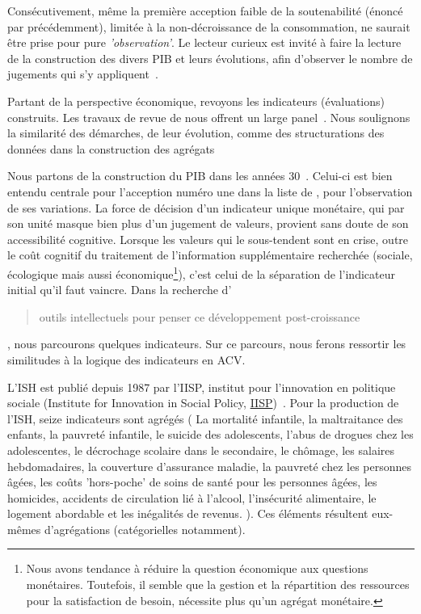 Consécutivement, même la première acception faible de la soutenabilité (énoncé par \citeauthor{perman_natural_2009} précédemment), limitée à la non-décroissance de la consommation, ne saurait être prise pour pure \emph{'observation'}.
Le lecteur curieux est invité à faire la lecture de la construction des divers \gls{PIB} et leurs évolutions, afin d'observer le nombre de jugements qui s'y appliquent~\cite{piriou_comptabilite_2004}.

Partant de la perspective économique, revoyons les indicateurs (évaluations) construits.
Les travaux de revue de \citeauthor*{sala_systemic_2015,gadrey_les_2012,roman_comment_2016}
nous offrent un large panel~\cite{sala_systemic_2015,gadrey_les_2012,roman_comment_2016}.
Nous soulignons la similarité des démarches, de leur évolution, comme des structurations des données dans la construction des agrégats

Nous partons de la construction du \gls{PIB} dans les années 30~\cite{kuznets_gross_1934}.
Celui-ci est bien entendu centrale pour l'acception numéro une dans la liste de \citeauthor{perman_natural_2009}, pour l'observation de ses variations.
La force de décision d'un indicateur unique monétaire, qui par son unité masque bien plus d'un jugement de valeurs, provient sans doute de son accessibilité cognitive.
Lorsque les valeurs qui le sous-tendent sont en crise, outre le coût cognitif du traitement de l'information supplémentaire recherchée (sociale, écologique mais aussi économique\footnote{Nous avons tendance à réduire la question économique aux questions monétaires. Toutefois, il semble que la gestion et la répartition des ressources pour la satisfaction de besoin, nécessite plus qu'un agrégat monétaire.}), c'est celui de la séparation de l'indicateur initial qu'il faut vaincre.
Dans la recherche d'\blockcquote{gadrey_croissance_2002}{outils intellectuels
pour penser ce développement post-croissance}, nous parcourons quelques indicateurs.
Sur ce parcours, nous ferons ressortir les similitudes à la logique des indicateurs en ACV.

L'\gls{ISH} %
est publié depuis 1987 par l'IISP, institut pour l'innovation en politique sociale (Institute for Innovation in Social Policy, \href{http://iisp.vassar.edu/ish.html}{IISP})~\cite{miringoff_americas_1995}.
Pour la production de l'\gls{ISH}, seize indicateurs sont agrégés (
La mortalité infantile, la maltraitance des enfants, la pauvreté infantile, le suicide des adolescents, l'abus de drogues chez les adolescentes, le décrochage scolaire dans le secondaire, le chômage, les salaires hebdomadaires, la couverture d'assurance maladie, la pauvreté chez les personnes âgées, les coûts 'hors-poche' de soins de santé pour les personnes âgées, les homicides, accidents de circulation lié à l'alcool, l'insécurité alimentaire, le logement abordable et les inégalités de revenus.
).
Ces éléments résultent eux-mêmes d’agrégations (catégorielles notamment).

